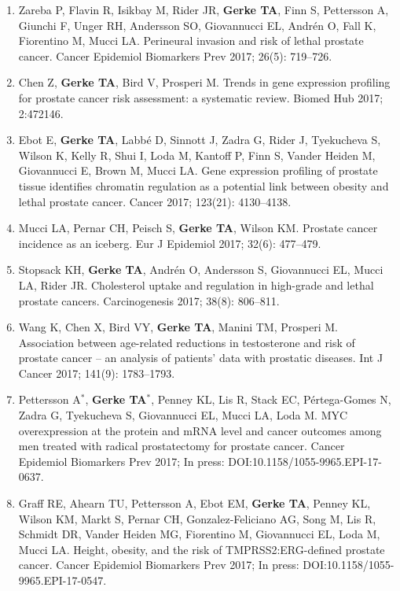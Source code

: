 \documentclass[11pt, a4paper]{article} %
\begin{document}
\begin{enumerate}[leftmargin=*]
\item{}  Zareba P, Flavin R, Isikbay M, Rider JR, {\bf Gerke TA}, Finn S, Pettersson A, Giunchi F, Unger RH, Andersson SO, Giovannucci EL, Andr\'{e}n O, Fall K, Fiorentino M, Mucci LA. Perineural invasion and risk of lethal prostate cancer. Cancer Epidemiol Biomarkers Prev 2017; 26(5): 719--726.

\item{} Chen Z, {\bf Gerke TA}, Bird V, Prosperi M. Trends in gene expression profiling for prostate cancer risk assessment: a systematic review. Biomed Hub 2017; 2:472146.

\item{} Ebot E, {\bf Gerke TA},  Labb\'{e} D, Sinnott J, Zadra G, Rider J, Tyekucheva S, Wilson K, Kelly R, Shui I, Loda M, Kantoff P, Finn S, Vander Heiden M, Giovannucci E, Brown M, Mucci LA. Gene expression profiling of prostate tissue identifies chromatin regulation as a potential link between obesity and lethal prostate cancer. Cancer 2017; 123(21): 4130--4138.

\item{} Mucci LA, Pernar CH, Peisch S, {\bf Gerke TA}, Wilson KM. Prostate cancer incidence as an iceberg. Eur J Epidemiol 2017; 32(6): 477--479.

\item{} Stopsack KH, {\bf Gerke TA}, Andr\'{e}n O, Andersson S, Giovannucci EL, Mucci LA, Rider JR. Cholesterol uptake and regulation in high-grade and lethal prostate cancers. Carcinogenesis 2017; 38(8): 806--811.

\item{} Wang K, Chen X, Bird VY, {\bf Gerke TA}, Manini TM, Prosperi M. Association between age-related reductions in testosterone and risk of prostate cancer -- an analysis of patients' data with prostatic diseases. Int J Cancer 2017; 141(9): 1783--1793.

\item{} Pettersson A$^*$, {\bf Gerke TA$^*$}, Penney KL, Lis R, Stack EC, P\'{e}rtega-Gomes N, Zadra G, Tyekucheva S, Giovannucci EL, Mucci LA, Loda M. MYC overexpression at the protein and mRNA level and cancer outcomes among men treated with radical prostatectomy for prostate cancer. Cancer Epidemiol Biomarkers Prev 2017; In press: DOI:10.1158/1055-9965.EPI-17-0637. 

\item{} Graff RE, Ahearn TU, Pettersson A, Ebot EM, {\bf Gerke TA}, Penney KL, Wilson KM, Markt S, Pernar CH, Gonzalez-Feliciano AG, Song M, Lis R, Schmidt DR, Vander Heiden MG, Fiorentino M, Giovannucci EL, Loda M, Mucci LA. Height, obesity, and the risk of TMPRSS2:ERG-defined prostate cancer. Cancer Epidemiol Biomarkers Prev 2017; In press: DOI:10.1158/1055-9965.EPI-17-0547. 


\end{enumerate}
\end{document}
